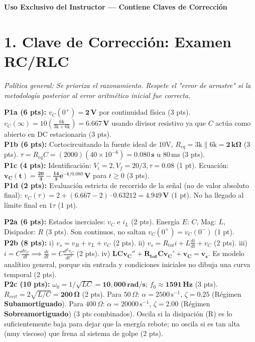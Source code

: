 \documentclass[11pt, a4paper]{article}
\begin{document}
\begin{tcolorbox}[colback=ucbblue!5!white, colframe=ucbblue, title=\textbf{Artefacto A2: Solucionario, Rúbrica y Checklist Docente (W13S3)}]
    \centering \textbf{Uso Exclusivo del Instructor — Contiene Claves de Corrección}
\end{tcolorbox}

\section*{1. Clave de Corrección: Examen RC/RLC}
\textit{Política general: Se prioriza el razonamiento. Respete el "error de arrastre" si la metodología posterior al error aritmético inicial fue correcta.}

\vspace{0.2cm}
\noindent\textbf{P1a (6 pts):} $v_C(0^+) = \mathbf{2\,\text{V}}$ por continuidad física (3 pts). $v_C(\infty) = 10\left(\frac{6\text{k}}{3\text{k}+6\text{k}}\right) = \mathbf{6.667\,\text{V}}$ usando divisor resistivo ya que $C$ actúa como abierto en DC estacionaria (3 pts). \\
\textbf{P1b (6 pts):} Cortocircuitando la fuente ideal de 10V, $R_{eq} = 3\text{k} \parallel 6\text{k} = \mathbf{2\,\text{k}\Omega}$ (3 pts). $\tau = R_{eq}C = (2000)(40\times 10^{-6}) = \mathbf{0.080\,\text{s}}$ u $80\,\text{ms}$ (3 pts). \\
\textbf{P1c (4 pts):} Identificación: $V_i=2, V_f=20/3, \tau=0.08$ (1 pt). Ecuación: $\mathbf{v_C(t) = \frac{20}{3} - \frac{14}{3}e^{-t/0.080}\,\text{V}}$ para $t\ge 0$ (3 pts). \\
\textbf{P1d (2 pts):} Evaluación estricta de recorrido de la señal (no de valor absoluto final): $v_C(\tau) = 2 + (6.667 - 2) \cdot 0.63212 = \mathbf{4.949\,\text{V}}$ (1 pt). No ha llegado al límite final en $1\tau$ (1 pt).

\vspace{0.4cm}
\noindent\textbf{P2a (6 pts):} Estados inerciales: $v_C$ e $i_L$ (2 pts). Energía $E$: $C$, Mag: $L$, Disipador: $R$ (3 pts). Son continuos, no saltan $v_C(0^+)=v_C(0^-)$ (1 pt). \\
\textbf{P2b (8 pts):} i) $v_s = v_R + v_L + v_C$ (2 pts). ii) $v_s = R_{tot}i + L\frac{di}{dt} + v_C$ (2 pts). iii) $i = C\frac{dv_C}{dt} \implies \frac{di}{dt} = C\frac{d^2v_C}{dt^2}$ (2 pts). iv) $\mathbf{LCv_C'' + R_{tot}Cv_C' + v_C = v_s}$. Es modelo analítico general, porque sin entrada y condiciones iniciales no dibuja una curva temporal (2 pts). \\
\textbf{P2c (10 pts):} $\omega_0 = 1/\sqrt{LC} = \mathbf{10,000\,\text{rad/s}}$; $f_0 \approx \mathbf{1591\,\text{Hz}}$ (3 pts). $R_{crit} = 2\sqrt{L/C} = \mathbf{200\,\Omega}$ (2 pts). Para $50\,\Omega$: $\alpha=2500\,\text{s}^{-1}$, $\zeta=\mathbf{0.25}$ (Régimen \textbf{Subamortiguado}). Para $400\,\Omega$: $\alpha=20000\,\text{s}^{-1}$, $\zeta=\mathbf{2.00}$ (Régimen \textbf{Sobreamortiguado}) (3 pts combinados). Oscila si la disipación (R) es lo suficientemente baja para dejar que la energía rebote; no oscila si es tan alta (muy viscoso) que frena al sistema de golpe (2 pts).
\end{document}
